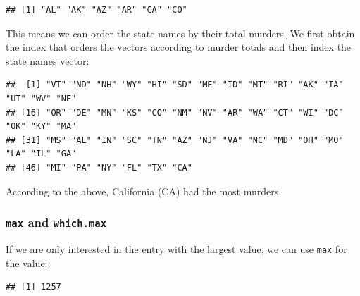 \documentclass[
]{article}
\newenvironment{Shaded}{\begin{snugshade}}{\end{snugshade}}
\newcommand{\DecValTok}[1]{\textcolor[rgb]{0.00,0.00,0.81}{#1}}
\newcommand{\FunctionTok}[1]{\textcolor[rgb]{0.13,0.29,0.53}{\textbf{#1}}}
\newcommand{\NormalTok}[1]{#1}
\newcommand{\OtherTok}[1]{\textcolor[rgb]{0.56,0.35,0.01}{#1}}
\newcommand{\SpecialCharTok}[1]{\textcolor[rgb]{0.81,0.36,0.00}{\textbf{#1}}}
\begin{document}
\begin{Shaded}
\end{Shaded}

\begin{verbatim}
## [1] "AL" "AK" "AZ" "AR" "CA" "CO"
\end{verbatim}

This means we can order the state names by their total murders. We first
obtain the index that orders the vectors according to murder totals and
then index the state names vector:

\begin{Shaded}
\end{Shaded}

\begin{verbatim}
##  [1] "VT" "ND" "NH" "WY" "HI" "SD" "ME" "ID" "MT" "RI" "AK" "IA" "UT" "WV" "NE"
## [16] "OR" "DE" "MN" "KS" "CO" "NM" "NV" "AR" "WA" "CT" "WI" "DC" "OK" "KY" "MA"
## [31] "MS" "AL" "IN" "SC" "TN" "AZ" "NJ" "VA" "NC" "MD" "OH" "MO" "LA" "IL" "GA"
## [46] "MI" "PA" "NY" "FL" "TX" "CA"
\end{verbatim}

According to the above, California (CA) had the most murders.

\subsubsection{\texorpdfstring{\texttt{max} and
\texttt{which.max}}{max and which.max}}\label{max-and-which.max}

If we are only interested in the entry with the largest value, we can
use \texttt{max} for the value:

\begin{Shaded}
\end{Shaded}

\begin{verbatim}
## [1] 1257
\end{verbatim}
\end{document}
